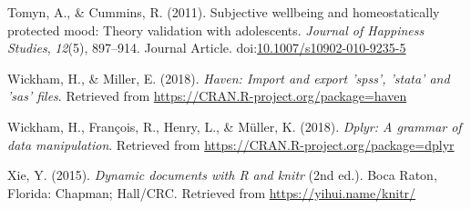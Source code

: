 \documentclass[man,floatsintext]{apa6}
\theoremstyle{definition}
\theoremstyle{definition}
\theoremstyle{definition}
\theoremstyle{remark}
\begin{document}
\hypertarget{ref-RN418}{}
Tomyn, A., \& Cummins, R. (2011). Subjective wellbeing and
homeostatically protected mood: Theory validation with adolescents.
\emph{Journal of Happiness Studies}, \emph{12}(5), 897--914. Journal
Article.
doi:\href{https://doi.org/10.1007/s10902-010-9235-5}{10.1007/s10902-010-9235-5}

\hypertarget{ref-R-haven}{}
Wickham, H., \& Miller, E. (2018). \emph{Haven: Import and export
'spss', 'stata' and 'sas' files}. Retrieved from
\url{https://CRAN.R-project.org/package=haven}

\hypertarget{ref-R-dplyr}{}
Wickham, H., François, R., Henry, L., \& Müller, K. (2018). \emph{Dplyr:
A grammar of data manipulation}. Retrieved from
\url{https://CRAN.R-project.org/package=dplyr}

\hypertarget{ref-R-knitr}{}
Xie, Y. (2015). \emph{Dynamic documents with R and knitr} (2nd ed.).
Boca Raton, Florida: Chapman; Hall/CRC. Retrieved from
\url{https://yihui.name/knitr/}

\endgroup

\clearpage

\renewcommand{\listfigurename}{Figure captions}

\listoffigures
\end{document}
